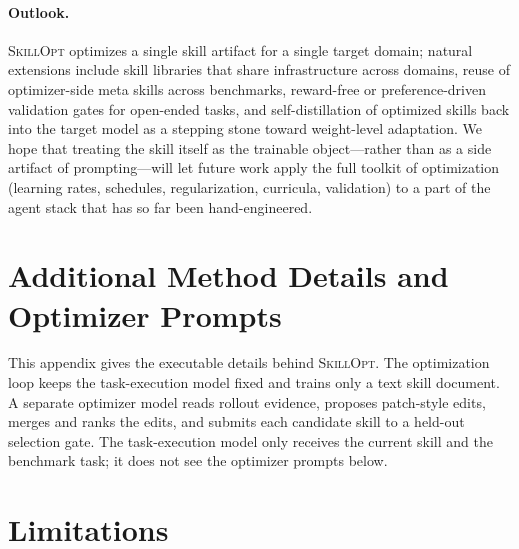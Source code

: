 \documentclass{llmxive}
\providecommand{\ourmethod}{\textsc{SkillOpt}\xspace}
\begin{document}
\paragraph{Outlook.}
\ourmethod{} optimizes a single skill artifact for a single target domain; natural extensions include skill libraries that share infrastructure across domains, reuse of optimizer-side meta skills across benchmarks, reward-free or preference-driven validation gates for open-ended tasks, and self-distillation of optimized skills back into the target model as a stepping stone toward weight-level adaptation. We hope that treating the skill itself as the trainable object---rather than as a side artifact of prompting---will let future work apply the full toolkit of optimization (learning rates, schedules, regularization, curricula, validation) to a part of the agent stack that has so far been hand-engineered.





\appendix
\section{Additional Method Details and Optimizer Prompts}
\label{app:method_prompts}

This appendix gives the executable details behind \ourmethod{}. The optimization loop keeps the task-execution model fixed and trains only a text skill document. A separate optimizer model reads rollout evidence, proposes patch-style edits, merges and ranks the edits, and submits each candidate skill to a held-out selection gate. The task-execution model only receives the current skill and the benchmark task; it does not see the optimizer prompts below.

\section{Limitations}
\end{document}
